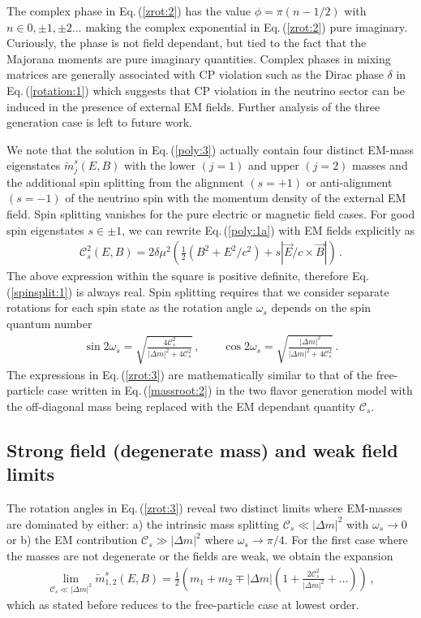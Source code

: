 \documentclass{ws-ijmpa}
\newcommand{\req}[1]{Eq.\,(\ref{#1})}
\begin{document}
The complex phase in \req{zrot:2} has the value $\phi=\pi(n-1/2)$ with $n\in0,\pm1,\pm2...$ making the complex exponential in \req{zrot:2} pure imaginary. Curiously, the phase is not field dependant, but tied to the fact that the Majorana moments are pure imaginary quantities. Complex phases in mixing matrices are generally associated with CP violation such as the Dirac phase $\delta$ in \req{rotation:1} which suggests that CP violation in the neutrino sector can be induced in the presence of external EM fields. Further analysis of the three generation case is left to future work.

We note that the solution in \req{poly:3} actually contain four distinct EM-mass eigenstates $\widetilde m_{j}^{s}(E,B)$ with the lower $(j=1)$ and upper $(j=2)$ masses and the additional spin splitting from the alignment $(s=+1)$ or anti-alignment $(s=-1)$ of the neutrino spin with the momentum density of the external EM field. Spin splitting vanishes for the pure electric or magnetic field cases. For good spin eigenstates $s\in\pm1$, we can rewrite \req{poly:1a} with EM fields explicitly as
\begin{align}
\label{spinsplit:1}
\mathcal{C}^{2}_{s}(E,B)=2\delta\mu^{2}\left(\frac{1}{2}(B^{2}+E^{2}/c^{2})+s|\vec{E}/c\times\vec{B}|\right)\,.
\end{align}
The above expression within the square is positive definite, therefore \req{spinsplit:1} is always real. Spin splitting requires that we consider separate rotations for each spin state as the rotation angle $\omega_{s}$ depends on the spin quantum number
\begin{align}
\label{zrot:3}
\sin2\omega_{s}=\sqrt{\frac{4\mathcal{C}_{s}^{2}}{|\Delta m|^{2}+4\mathcal{C}_{s}^{2}}}\,,\qquad
\cos2\omega_{s}=\sqrt{\frac{|\Delta m|^{2}}{|\Delta m|^{2}+4\mathcal{C}_{s}^{2}}}\,.
\end{align}
The expressions in \req{zrot:3} are mathematically similar to that of the free-particle case written in \req{massroot:2} in the two flavor generation model with the off-diagonal mass being replaced with the EM dependant quantity $\mathcal{C}_{s}$.

\subsection{Strong field (degenerate mass) and weak field limits}
\label{sec:nulimits}
The rotation angles in \req{zrot:3} reveal two distinct limits where EM-masses are dominated by either: a) the intrinsic mass splitting $\mathcal{C}_{s}\ll|\Delta m|^{2}$ with $\omega_{s}\rightarrow0$ or b) the EM contribution $\mathcal{C}_{s}\gg|\Delta m|^{2}$ where $\omega_{s}\rightarrow\pi/4$.
For the first case where the masses are not degenerate or the fields are weak, we obtain the expansion
\begin{align}
\label{series:1}
\lim_{\mathcal{C}_{s}\ll|\Delta m|^{2}}\widetilde m_{1,2}^{s}(E,B)=\frac{1}{2}\left(m_{1}+m_{2}\mp|\Delta m|\left(1+\frac{2\mathcal{C}_{s}^{2}}{|\Delta m|^{2}}+\ldots\right)\right)\,,
\end{align}
which as stated before reduces to the free-particle case at lowest order.
\end{document}
